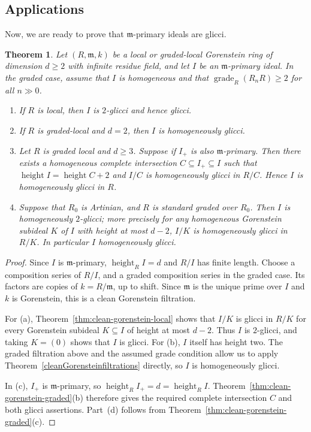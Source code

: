 \documentclass[11pt,letterpaper]{amsart}
\newcommand{\seq}{\subseteq}
\DeclareMathOperator{\height}{height}
\theoremstyle{plain}
\newtheorem{thm}{Theorem}[section]
\theoremstyle{definition}
\theoremstyle{remark}
\begin{document}
\subsection{Applications}

Now, we are ready to prove that $\mathfrak m$-primary ideals are glicci. 

\begin{thm}\label{thm:clean-primary-applications}\label{mprimaryglicci}
Let $(R,\mathfrak m,k)$ be a local or graded-local Gorenstein ring of
dimension $d\geq 2$ with infinite residue field, and let $I$ be an
$\mathfrak m$-primary ideal. In the graded case, assume that $I$ is
homogeneous and that $\operatorname{grade}_R(R_nR)\geq 2$ for all $n\gg 0$.
\begin{enumerate}
\item[\textup{(a)}] If $R$ is local, then $I$ is $2$-glicci and hence glicci.
\item[\textup{(b)}] If $R$ is graded-local and $d=2$, then $I$ is homogeneously
glicci.
\item[\textup{(c)}]  Let $R$ is graded local and $d\ge 3$. Suppose if $I_+$ is also $\mathfrak m$-primary. Then there exists a homogeneous complete intersection $C\seq I_+\seq I$ such that $\height I=\height C+2$ and $I/C$ is homogeneously glicci in $R/C$. Hence $I$ is homogeneously glicci in $R$.

\item[\textup{(d)}] Suppose that $R_0$ is Artinian, and $R$ is standard graded over $R_0$. Then $I$ is
homogeneously $2$-glicci; more precisely for any homogeneous Gorenstein subideal $K$ of $I$ with height at most $d-2$, $I/K$ is homogeneously glicci in $R/K$. In particular $I$ homogeneously glicci. 
\end{enumerate}
\end{thm}

\begin{proof}
Since \(I\) is \(\mathfrak m\)-primary, \(\height_R I=d\) and \(R/I\) has finite length. Choose a composition series of \(R/I\), and a graded composition series in the graded case. Its factors are copies of \(k=R/\mathfrak m\), up to shift. Since \(\mathfrak m\) is the unique prime over \(I\) and \(k\) is Gorenstein, this is a clean Gorenstein filtration.

For \textup{(a)}, Theorem~\ref{thm:clean-gorenstein-local} shows that \(I/K\) is glicci in \(R/K\)
for every Gorenstein subideal \(K\subseteq I\) of height at most \(d-2\).
Thus \(I\) is \(2\)-glicci, and taking \(K=(0)\) shows that \(I\) is
glicci. For \textup{(b)}, \(I\) itself has height two. The graded
filtration above and the assumed grade condition allow us to apply
Theorem~\ref{cleanGorensteinfiltrations} directly, so \(I\) is homogeneously glicci.

In \textup{(c)}, \(I_+\) is \(\mathfrak m\)-primary, so
\(\height_R I_+=d=\height_R I\). Theorem~\ref{thm:clean-gorenstein-graded}\textup{(b)} therefore
gives the required complete intersection \(C\) and both glicci
assertions. Part~\textup{(d)} follows from Theorem~\ref{thm:clean-gorenstein-graded}\textup{(c)}.
\end{proof}
\end{document}
